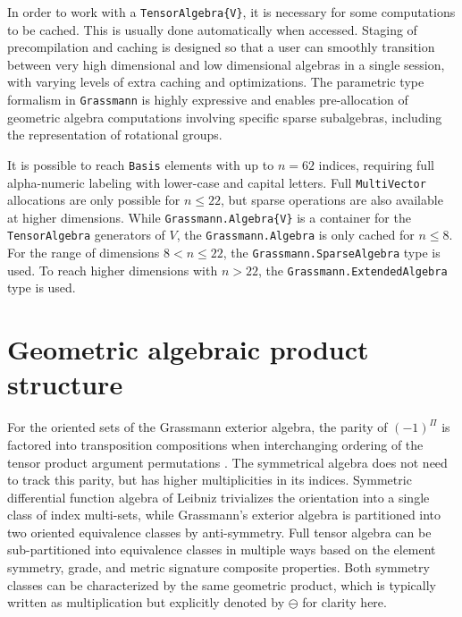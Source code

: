 \documentclass{juliacon}
\begin{document}
In order to work with a \verb`TensorAlgebra{V}`, it is necessary for some computations to be cached. This is usually done automatically when accessed.
Staging of precompilation and caching is designed so that a user can smoothly transition between very high dimensional and low dimensional algebras in a single session, with varying levels of extra caching and optimizations.
The parametric type formalism in \verb`Grassmann` is highly expressive and enables pre-allocation of geometric algebra computations involving specific sparse subalgebras, including the representation of rotational groups.

It is possible to reach \verb`Basis` elements with up to $n=62$ indices, %
requiring full alpha-numeric labeling with lower-case and capital letters. 
Full \verb`MultiVector` allocations are only possible for $n\leq22$, but sparse operations are also available at higher dimensions.
While \verb`Grassmann.Algebra{V}` is a container for the \verb`TensorAlgebra` generators of $V$, the \verb`Grassmann.Algebra` is only cached for $n\leq8$.
For the range of dimensions $8<n\leq22$, the \verb`Grassmann.SparseAlgebra` type is used.
To reach higher dimensions with $n>22$, the \verb`Grassmann.ExtendedAlgebra` type is used.

\section{Geometric algebraic product structure}

For the oriented sets of the Grassmann exterior algebra, the parity of $(-1)^\Pi$ is factored into transposition compositions when interchanging ordering of the tensor product argument permutations \cite{artin}.
The symmetrical algebra does not need to track this parity, but has higher multiplicities in its indices.
Symmetric differential function algebra of Leibniz trivializes the orientation into a single class of index multi-sets, while Grassmann's exterior algebra is partitioned into two oriented equivalence classes by anti-symmetry.
Full tensor algebra can be sub-partitioned into equivalence classes in multiple ways based on the element symmetry, grade, and metric signature composite properties.
Both symmetry classes can be characterized by the same geometric product, which is typically written as multiplication but explicitly denoted by $\ominus$ for clarity here.
\end{document}
